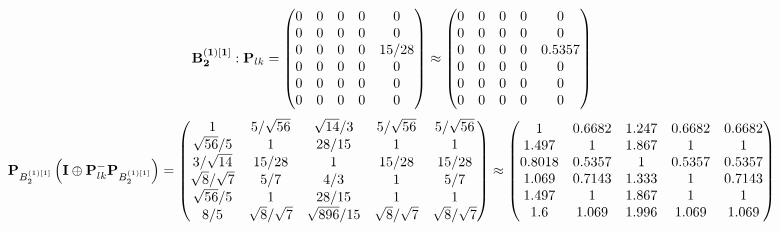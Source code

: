 \documentclass[10pt,a4paper]{article}
\begin{document}
	\[
		\bold{B_2^{(1)[1]}}: \bold{P}_{lk} = 
		\begin{pmatrix}
			{{0}}{} & {{0}}{} & {{0}}{} & {{0}}{} & {{0}}{} \\
			{{0}}{} & {{0}}{} & {{0}}{} & {{0}}{} & {{0}}{} \\
			{{0}}{} & {{0}}{} & {{0}}{} & {{0}}{} & {{15}} / {{28}} \\
			{{0}}{} & {{0}}{} & {{0}}{} & {{0}}{} & {{0}}{} \\
			{{0}}{} & {{0}}{} & {{0}}{} & {{0}}{} & {{0}}{} \\
			{{0}}{} & {{0}}{} & {{0}}{} & {{0}}{} & {{0}}{} \\
		\end{pmatrix}
		\approx
		\begin{pmatrix}
			0        & 0        & 0        & 0        & 0        \\
			0        & 0        & 0        & 0        & 0        \\
			0        & 0        & 0        & 0        & 0.5357   \\
			0        & 0        & 0        & 0        & 0        \\
			0        & 0        & 0        & 0        & 0        \\
			0        & 0        & 0        & 0        & 0        \\
		\end{pmatrix}
	\]
	\[
		\bold{P}_{B_2^{(1)[1]}}\left(\bold{I} \oplus \bold{P}_{lk}^{-}\bold{P}_{B_2^{(1)[1]}}\right) = 
		\begin{pmatrix}
			{1}{} & {{5}} / {\sqrt{56}} & {\sqrt{14}} / {{3}} & {{5}} / {\sqrt{56}} & {{5}} / {\sqrt{56}} \\
			{\sqrt{56}} / {{5}} & {1}{} & {{28}} / {{15}} & {1}{} & {1}{} \\
			{{3}} / {\sqrt{14}} & {{15}} / {{28}} & {1}{} & {{15}} / {{28}} & {{15}} / {{28}} \\
			{\sqrt{8}} / {\sqrt{7}} & {{5}} / {{7}} & {{4}} / {{3}} & {1}{} & {{5}} / {{7}} \\
			{\sqrt{56}} / {{5}} & {1}{} & {{28}} / {{15}} & {1}{} & {1}{} \\
			{{8}} / {{5}} & {\sqrt{8}} / {\sqrt{7}} & {\sqrt{896}} / {{15}} & {\sqrt{8}} / {\sqrt{7}} & {\sqrt{8}} / {\sqrt{7}} \\
		\end{pmatrix}
		\approx
		\begin{pmatrix}
			1        & 0.6682   & 1.247    & 0.6682   & 0.6682   \\
			1.497    & 1        & 1.867    & 1        & 1        \\
			0.8018   & 0.5357   & 1        & 0.5357   & 0.5357   \\
			1.069    & 0.7143   & 1.333    & 1        & 0.7143   \\
			1.497    & 1        & 1.867    & 1        & 1        \\
			1.6      & 1.069    & 1.996    & 1.069    & 1.069    \\
		\end{pmatrix}
	\]
\end{document}

